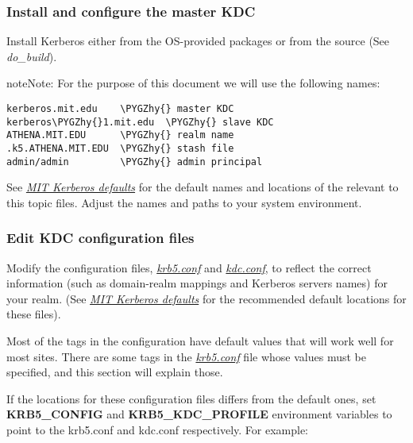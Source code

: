 \documentclass[letterpaper,10pt,english]{sphinxmanual}
\def\PYGZhy{\char`\-}
\begin{document}
\subsubsection{Install and configure the master KDC}
\label{admin/install_kdc:install-and-configure-the-master-kdc}
Install Kerberos either from the OS-provided packages or from the
source (See \emph{do\_build}).

\begin{notice}{note}{Note:}
For the purpose of this document we will use the following
names:

\begin{Verbatim}[commandchars=\\\{\}]
kerberos.mit.edu    \PYGZhy{} master KDC
kerberos\PYGZhy{}1.mit.edu  \PYGZhy{} slave KDC
ATHENA.MIT.EDU      \PYGZhy{} realm name
.k5.ATHENA.MIT.EDU  \PYGZhy{} stash file
admin/admin         \PYGZhy{} admin principal
\end{Verbatim}

See {\hyperref[mitK5defaults:mitk5defaults]{\emph{MIT Kerberos defaults}}} for the default names and locations
of the relevant to this topic files.  Adjust the names and
paths to your system environment.
\end{notice}


\subsubsection{Edit KDC configuration files}
\label{admin/install_kdc:edit-kdc-configuration-files}
Modify the configuration files, {\hyperref[admin/conf_files/krb5_conf:krb5-conf-5]{\emph{krb5.conf}}} and
{\hyperref[admin/conf_files/kdc_conf:kdc-conf-5]{\emph{kdc.conf}}}, to reflect the correct information (such as
domain-realm mappings and Kerberos servers names) for your realm.
(See {\hyperref[mitK5defaults:mitk5defaults]{\emph{MIT Kerberos defaults}}} for the recommended default locations for
these files).

Most of the tags in the configuration have default values that will
work well for most sites.  There are some tags in the
{\hyperref[admin/conf_files/krb5_conf:krb5-conf-5]{\emph{krb5.conf}}} file whose values must be specified, and this
section will explain those.

If the locations for these configuration files differs from the
default ones, set \textbf{KRB5\_CONFIG} and \textbf{KRB5\_KDC\_PROFILE} environment
variables to point to the krb5.conf and kdc.conf respectively.  For
example:
\end{document}
